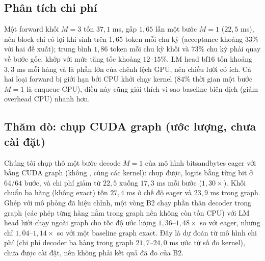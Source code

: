 \documentclass[a4paper,11pt]{article}
\newcommand{\code}[1]{\texttt{\detokenize{#1}}}
\begin{document}
\subsection{Phân tích chi phí}
Một forward khối $M{=}3$ tốn $37{,}1$ ms, gấp $1{,}65$ lần một bước $M{=}1$ ($22{,}5$ ms), nên block chỉ có lợi khi sinh trên $1{,}65$ token mỗi chu kỳ (acceptance khoảng $33\%$ với hai đề xuất); trung bình $1{,}86$ token mỗi chu kỳ khối và $73\%$ chu kỳ phải quay về bước gốc, khớp với mức tăng tốc khoảng $12$--$15\%$. LM head bf16 tốn khoảng $3{,}3$ ms mỗi hàng và là phần lớn của chênh lệch GPU, nên chiếu lười có ích. Cả hai loại forward bị giới hạn bởi CPU khởi chạy kernel ($84\%$ thời gian một bước $M{=}1$ là enqueue CPU), điều này cũng giải thích vì sao baseline biên dịch (giảm overhead CPU) nhanh hơn.

\subsection{Thăm dò: chụp CUDA graph (ước lượng, chưa cài đặt)}
Chúng tôi chụp thô một bước decode $M{=}1$ của mô hình bitsandbytes eager với \code{StaticCache} bằng CUDA graph (không \code{torch.compile}, cùng các kernel): chụp được, logits bằng từng bit ở $64/64$ bước, và chi phí giảm từ $22{,}5$ xuống $17{,}3$ ms mỗi bước ($1{,}30\times$). Khối chuẩn ba hàng (không exact) tốn $27{,}4$ ms ở chế độ eager và $23{,}9$ ms trong graph. Ghép với mô phỏng đã hiệu chỉnh, một vòng B2 chạy phần thân decoder trong graph (các phép từng hàng nằm trong graph nên không còn tốn CPU) với LM head lười chạy ngoài graph cho tốc độ ước lượng $1{,}36$--$1{,}48\times$ so với eager, nhưng chỉ $1{,}04$--$1{,}14\times$ so với một baseline graph exact. Đây là dự đoán từ mô hình chi phí (chi phí decoder ba hàng trong graph $21{,}7$--$24{,}0$ ms ước từ số đo kernel), chưa được cài đặt, nên không phải kết quả đã đo của B2.
\end{document}

